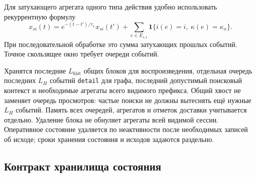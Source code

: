\documentclass[12pt,a4paper]{article}
\newcommand{\code}[1]{{\ttfamily\small\nolinkurl{#1}}}
\newcommand{\ind}{\mathbf 1}
\theoremstyle{plainru}
\begin{document}
Для затухающего агрегата одного типа действия удобно использовать
рекуррентную формулу
\begin{equation}\label{eq:ops-decay-update}
x_{si}(t)=e^{-(t-t')/\tau_x}x_{si}(t')+
\sum_{e\in E_{s,t}}\ind\{i(e)=i,\ \kappa(e)=\kappa_x\}.
\end{equation}
При последовательной обработке это сумма затухающих прошлых событий.
Точное скользящее окно требует очереди событий.

Хранятся последние \(L_{\mathrm{hist}}\) общих блоков для воспроизведения,
отдельная очередь последних $L_H$ событий \code{detail} для графа,
последний допустимый поисковый контекст и необходимые агрегаты
всего видимого префикса. Общий хвост не заменяет очередь просмотров:
частые поиски не должны вытеснять ещё нужные $L_H$ событий.
Память всех очередей, агрегатов и отметок доставки учитывается отдельно.
Удаление блока не обнуляет
агрегаты всей видимой сессии. Оперативное состояние удаляется
по неактивности после необходимых записей об исходе; сроки хранения
состояния и исходов задаются раздельно.

\subsection{Контракт хранилища состояния}
\label{sec:ops-state-storage}
\end{document}
